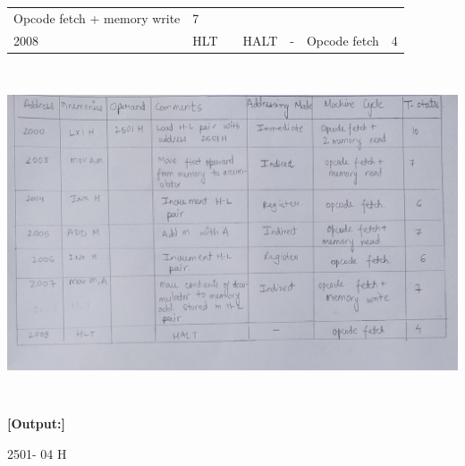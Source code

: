 \documentclass[11pt,twocolumn]{article}
\begin{document}
\begin{longtable}[]{@{}lllllll@{}}
\begin{minipage}[t]{0.17\columnwidth}
Opcode fetch + memory write\strut
\end{minipage} & \begin{minipage}[t]{0.05\columnwidth}\raggedright
7\strut
\end{minipage}\tabularnewline
\begin{minipage}[t]{0.04\columnwidth}\raggedright
2008\strut
\end{minipage} & \begin{minipage}[t]{0.05\columnwidth}\raggedright
HLT\strut
\end{minipage} & \begin{minipage}[t]{0.05\columnwidth}\raggedright
\strut
\end{minipage} & \begin{minipage}[t]{0.37\columnwidth}\raggedright
HALT\strut
\end{minipage} & \begin{minipage}[t]{0.09\columnwidth}\raggedright
-\strut
\end{minipage} & \begin{minipage}[t]{0.17\columnwidth}\raggedright
Opcode fetch\strut
\end{minipage} & \begin{minipage}[t]{0.05\columnwidth}\raggedright
4\strut
\end{minipage}\tabularnewline
\bottomrule
\end{longtable}

\includegraphics[width=6.35in,height=3.87727in]{media/image1.jpg}

\textbf{{[}Output:{]}}

2501- 04 H
\end{document}
